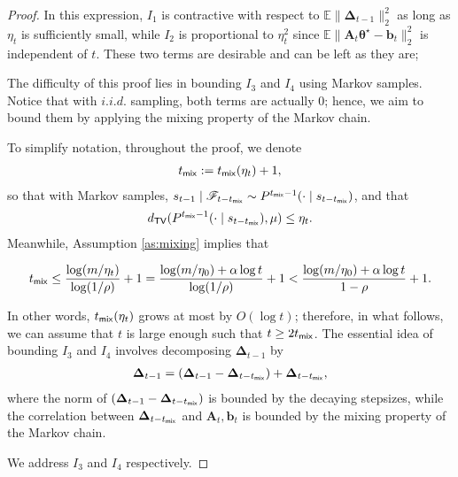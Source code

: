 \begin{proof}
In this expression, $I_1$ is contractive with respect to $\mathbb{E}\|\bm{\Delta}_{t-1}\|_2^2$ as long as $\eta_t$ is sufficiently small, while $I_2$ is proportional to $\eta_t^2$ since $\mathbb{E}\|\bm{A}_t\bm{\theta}^\star - \bm{b}_t\|_2^2$ is independent of $t$. These two terms are desirable and can be left as they are; 

The difficulty of this proof lies in bounding $I_3$ and $I_4$ using Markov samples. Notice that with $i.i.d.$ sampling, both terms are actually $0$; hence, we aim to bound them by applying the mixing property of the Markov chain. 

To simplify notation, throughout the proof, we denote 
\begin{align*}
t_{\mathsf{mix}}:=t_{\mathsf{mix}}(\eta_t) + 1,
\end{align*}
so that with Markov samples, $s_{t-1}\mid \mathscr{F}_{t-t_{\mathsf{mix}}} \sim P^{t_{\mathsf{mix}}-1}(\cdot \mid s_{t-t_{\mathsf{mix}}})$, and that
\begin{align*}
d_{\mathsf{TV}}(P^{t_{\mathsf{mix}}-1}(\cdot \mid s_{t-t_{\mathsf{mix}}}),\mu) \leq \eta_t.
\end{align*}
Meanwhile, Assumption \ref{as:mixing} implies that

\begin{align}\label{eq:tmix-bound-L2}
t_{\mathsf{mix}} \leq \frac{\log(m/\eta_t)}{\log(1/\rho)} +1 = \frac{\log(m/\eta_0) + \alpha \log t}{\log(1/\rho)} + 1< \frac{\log(m/\eta_0) + \alpha \log t}{1-\rho} + 1.
\end{align}

In other words, $t_{\mathsf{mix}}(\eta_t)$ grows at most by $O(\log t)$; therefore, in what follows, we can assume that $t$ is large enough such that $t \geq 2t_{\mathsf{mix}}$. The essential idea of bounding $I_3$ and $I_4$ involves decomposing $\bm{\Delta}_{t-1}$ by
\begin{align*}
\bm{\Delta}_{t-1} = (\bm{\Delta}_{t-1} - \bm{\Delta}_{t-t_{\mathsf{mix}}}) + \bm{\Delta}_{t-t_{\mathsf{mix}}},
\end{align*}
where the norm of $(\bm{\Delta}_{t-1} - \bm{\Delta}_{t-t_{\mathsf{mix}}})$ is bounded by the decaying stepsizes, while the correlation between $\bm{\Delta}_{t-t_{\mathsf{mix}}}$ and $\bm{A}_t, \bm{b}_t$ is bounded by the mixing property of the Markov chain.

We address $I_3$ and $I_4$ respectively.


\end{proof}
